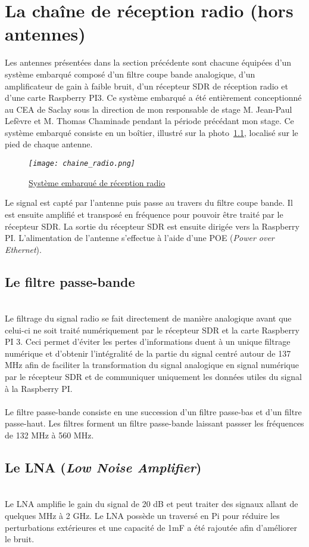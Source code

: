 \documentclass[12pt,fleqn]{book} %
\begin{document}
\chapter{La chaîne de réception radio (hors antennes)}
Les antennes présentées dans la section précédente sont chacune équipées d'un système embarqué composé d'un filtre coupe bande analogique, d'un amplificateur de gain à faible bruit, d'un récepteur SDR de réception radio et d'une carte Raspberry PI3. Ce système embarqué a été entièrement conceptionné au CEA de Saclay sous la direction de mon responsable de stage M. Jean-Paul Lefèvre et M. Thomas Chaminade pendant la période précédant mon stage.
Ce système embarqué consiste en un boîtier, illustré sur la photo~\underline{\color{blue}\ref{boîtier}}, localisé sur le pied de chaque antenne.
\begin{figure}[H]
	\centering
	\itshape
	\texttt{[image: chaine\_radio.png]}
	\caption{\label{boîtier} \underline{Système embarqué de réception radio}}
\end{figure}
Le signal est capté par l'antenne puis passe au travers du filtre coupe bande. Il est ensuite amplifié et transposé en fréquence pour pouvoir être traité par le récepteur SDR. La sortie du récepteur SDR est ensuite dirigée vers la Raspberry PI. L'alimentation de l'antenne s'effectue à l'aide d'une POE (\emph{Power over Ethernet}).
\section{Le filtre passe-bande}
~\\\indent Le filtrage du signal radio se fait directement de manière analogique avant que celui-ci ne soit traité numériquement par le récepteur SDR et la carte Raspberry PI 3. Ceci permet d'éviter les pertes d'informations duent à un unique filtrage numérique et d'obtenir l'intégralité de la partie du signal centré autour de 137 MHz afin de faciliter la transformation du signal analogique en signal numérique par le récepteur SDR et de communiquer uniquement les données utiles du signal à la Raspberry PI.
~\\\\Le filtre passe-bande consiste en une succession d'un filtre passe-bas et d'un filtre passe-haut. Les filtres forment un filtre passe-bande laissant passser les fréquences de 132 MHz à 560 MHz.
\section{Le LNA (\emph{Low Noise Amplifier})}
~\\\indent Le LNA amplifie le gain du signal de 20 dB et peut traiter des signaux allant de quelques MHz à 2 GHz. Le LNA possède un traversé en Pi pour réduire les perturbations extérieures et une capacité de 1mF a été rajoutée afin d’améliorer le bruit.
\end{document}
